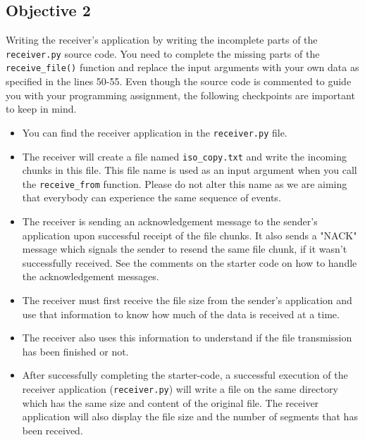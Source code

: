 \documentclass[11pt]{article}
\begin{document}

\subsection{Objective 2}
\label{subsec:obj2}
Writing the receiver's application by writing the incomplete parts of the \texttt{receiver.py} source code. You need to complete the missing parts of the \texttt{receive\_file()} function and replace the input arguments with your own data as specified in the lines 50-55. Even though the source code is commented to guide you with your programming assignment, the following checkpoints are important to keep in mind.

\begin{itemize}
    \item You can find the receiver application in the \texttt{receiver.py} file.
    \item The receiver will create a file named \texttt{iso\_copy.txt} and write the incoming chunks in this file. This file name is used as an input argument when you call the \texttt{receive\_from} function. Please do not alter this name as we are aiming that everybody can experience the same sequence of events.
    \item The receiver is sending an acknowledgement message to the sender's application upon successful receipt of the file chunks. It also sends a "NACK" message which signals the sender to resend the same file chunk, if it wasn't successfully received. See the comments on the starter code on how to handle the acknowledgement messages.
    \item The receiver must first receive the file size from the sender's application and use that information to know how much of the data is received at a time.
    \item The receiver also uses this information to understand if the file transmission has been finished or not.
    \item After successfully completing the starter-code, a successful execution of the receiver application (\texttt{receiver.py}) will write a file on the same directory which has the same size and content of the original file. The receiver application will also display the file size and the number of segments that has been received.
\end{itemize}
\end{document}
